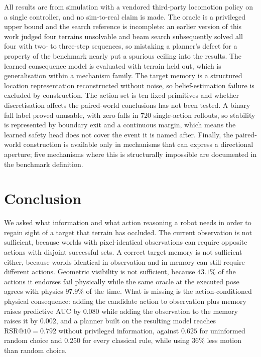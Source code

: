 \documentclass[conference]{IEEEtran}
\begin{document}
All results are from simulation with a vendored third-party locomotion policy on a
single controller, and no sim-to-real claim is made. The oracle is a privileged upper
bound and the search reference is incomplete: an earlier version of this work judged
four terrains unsolvable and beam search subsequently solved all four with two- to
three-step sequences, so mistaking a planner's defect for a property of the benchmark
nearly put a spurious ceiling into the results. The learned consequence model is
evaluated with terrain held out, which is generalisation within a mechanism family.
The target memory is a structured location representation reconstructed without noise,
so belief-estimation failure is excluded by construction. The action set is ten fixed
primitives and whether discretisation affects the paired-world conclusions has not
been tested. A binary fall label proved unusable, with zero falls in 720 single-action
rollouts, so stability is represented by boundary exit and a continuous margin, which
means the learned safety head does not cover the event it is named after. Finally, the
paired-world construction is available only in mechanisms that can express a
directional aperture; five mechanisms where this is structurally impossible are
documented in the benchmark definition.

\section{Conclusion}

We asked what information and what action reasoning a robot needs in order to regain
sight of a target that terrain has occluded. The current observation is not
sufficient, because worlds with pixel-identical observations can require opposite
actions with disjoint successful sets. A correct target memory is not sufficient
either, because worlds identical in observation and in memory can still require
different actions. Geometric visibility is not sufficient, because $43.1\%$ of the
actions it endorses fail physically while the same oracle at the executed pose agrees
with physics $97.9\%$ of the time. What is missing is the action-conditioned physical
consequence: adding the candidate action to observation plus memory raises predictive
AUC by $0.080$ while adding the observation to the memory raises it by $0.002$, and a
planner built on the resulting model reaches $\mathrm{RSR}@10 = 0.792$ without
privileged information, against $0.625$ for uninformed random choice and $0.250$ for
every classical rule, while using $36\%$ less motion than random choice.
\end{document}
